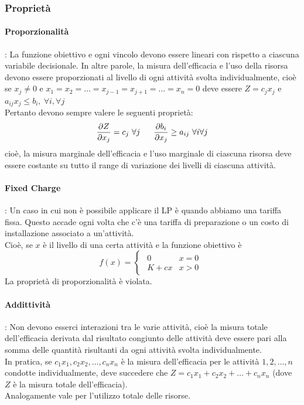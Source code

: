 \documentclass[12pt,a4paper]{article}
\begin{document}
\subsubsection{Proprietà}
\paragraph{Proporzionalità}: La funzione obiettivo e ogni vincolo devono essere lineari con
rispetto a ciascuna variabile decisionale. In altre parole, la misura dell'efficacia e l'uso della risorsa devono essere proporzionati al livello di ogni attività svolta individualmente, cioè se $x_j \not =0$ e $x_1=x_2=\dots=x_{j-1}=x_{j+1}=\dots=x_n = 0$ deve essere $Z=c_jx_j$ e $a_{ij}x_j \leq b_i, \ \forall i, \forall j$\\
Pertanto devono sempre valere le seguenti proprietà:
$${\partial Z \over \partial x_j} =c_j \ \forall j \ \ \ \ \ {\partial b_i \over \partial x_j}\geq a_{ij} \ \forall i \forall j$$
cioè, la misura marginale dell'efficacia e l'uso marginale di ciascuna risorsa deve essere costante su tutto il range di variazione dei livelli di ciascuna attività.

\paragraph{Fixed Charge}: Un caso in cui non è possibile applicare il LP è quando abbiamo una tariffa fissa. Questo accade ogni volta che c'è una tariffa di preparazione o un costo di installazione associato a un'attività.\\
Cioè, se $x$ è il livello di una certa attività e la funzione obiettivo è
\begin{equation*}
f(x) = \begin{cases} \begin{array}{ll}0 & x=0\\K+cx & x > 0\end{array}\end{cases}
\end{equation*}
La proprietà di proporzionalità è violata.

\paragraph{Addittività}: Non devono esserci interazioni tra le varie attività, cioè la misura totale dell'efficacia derivata dal risultato congiunto delle attività deve essere pari alla somma delle quantità risultanti da ogni attività svolta individualmente.\\
In pratica, se $c_1x_1,c_2x_2, \dots , c_nx_n$ è la misura dell'efficacia per le attività $1,2,\dots, n$ condotte individualmente, deve succedere che $Z=c_1x_1+c_2x_2+\dots+c_nx_n$ (dove $Z$ è la misura totale dell'efficacia).\\
Analogamente vale per l'utilizzo totale delle risorse.
\end{document}
